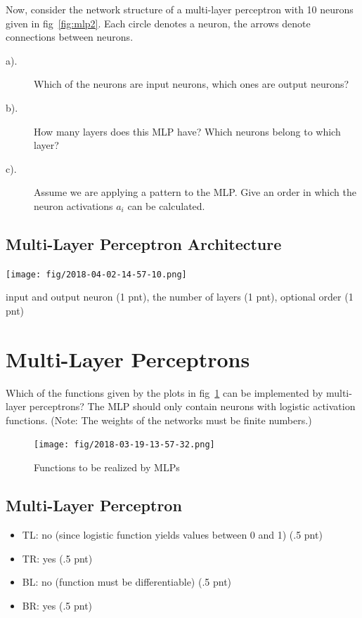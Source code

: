 \documentclass[12pt]{article}
\providecommand{\tightlist}{%
	\setlength{\itemsep}{0pt}\setlength{\parskip}{0pt}}
\begin{document}
Now, consider the network structure of a multi-layer perceptron with 10 neurons given in
fig~\ref{fig:mlp2}. Each circle denotes a neuron, the arrows denote connections between neurons.
\begin{description}
	\item[a).]  Which of the neurons are input neurons, which ones are output neurons?
	\item[b).] How many layers does this MLP have? Which neurons belong to which layer?
	\item[c).] Assume we are applying a pattern to the MLP. Give an order in which the neuron
	      activations $a_i$ can be calculated.
\end{description}

\subsection{Multi-Layer Perceptron Architecture}

\begin{center}
	\texttt{[image: fig/2018-04-02-14-57-10.png]}
\end{center}

input and output neuron (1 pnt), the number of layers (1 pnt), optional order (1 pnt)


\section{Multi-Layer Perceptrons}

Which of the functions given by the plots in fig~\ref{fig:mlp3} can be implemented by multi-layer
perceptrons? The MLP should only contain neurons with logistic activation functions.
(Note: The weights of the networks must be finite numbers.)

\begin{figure}
	\centering
	\texttt{[image: fig/2018-03-19-13-57-32.png]}
	\caption{Functions to be realized by MLPs} \label{fig:mlp3}
\end{figure}

\subsection{Multi-Layer Perceptron}

\begin{itemize}
	\tightlist
	\item  TL: no (since logistic function yields values between 0 and 1) (.5 pnt)
	\item TR: yes (.5 pnt)
	\item  BL: no (function must be differentiable) (.5 pnt)
	\item  BR: yes (.5 pnt)
\end{itemize}
\end{document}
